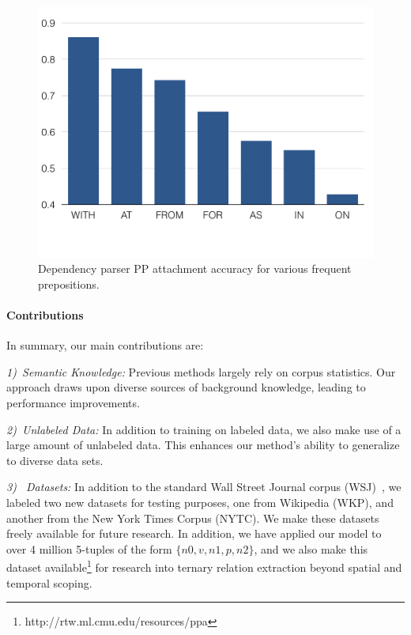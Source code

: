          \begin{figure}[t]
                 \centering
                 \includegraphics[width=0.80\columnwidth] {mainresults-0.pdf}
                 \vspace*{-0.8cm}
                 \caption{Dependency parser PP attachment accuracy for various frequent prepositions.}
                 \label{fig:parser}
                 \end{figure}  
        
                
\paragraph{Contributions}
In summary,  our main contributions are: 
 
\textit{1)~Semantic Knowledge:} 
Previous  methods largely rely on  corpus statistics. Our approach  draws upon 
 diverse sources of background knowledge, leading to performance improvements.
 
\textit{2)~Unlabeled  Data:} In addition to training on labeled  data, we also make use of a large amount of unlabeled data. This enhances our method's ability to generalize to diverse data sets. 

\textit{3)~ Datasets:} In addition to the standard Wall Street Journal corpus (WSJ)~\cite{Ratnaparkhi1994}, we labeled two new datasets for testing purposes, one from Wikipedia (WKP), and another from the  New York Times Corpus (NYTC). We make  these datasets freely available for future research.  In addition, we have applied our  model to over 4 million 5-tuples of the form $\{n0, v, n1, p, n2\}$, and we also make this dataset  available\footnote{http://rtw.ml.cmu.edu/resources/ppa} for research into ternary relation extraction beyond spatial and  temporal scoping.